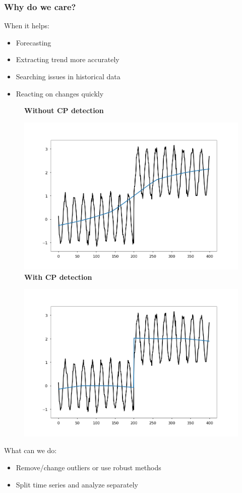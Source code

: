 \documentclass[intlimits, 9pt, unicode]{beamer}
\begin{document}
\begin{frame}
    \frametitle{Why do we care?}
When it helps:
    \begin{itemize}
    	\item Forecasting
	\item Extracting trend more accurately
    	\item Searching issues in historical data 
	\item Reacting on changes quickly
    \end{itemize}
   
	\begin{figure}
		\textbf{Without CP detection}\par\medskip
		\includegraphics[scale=0.05]{images/trend_fallacy}
		\textbf{With CP detection}\par\medskip
		\includegraphics[scale=0.05]{images/trend_succeed}
	\end{figure}
    
What can we do:
    \begin{itemize}
    	\item Remove/change outliers or use robust methods
	\item Split time series and analyze separately
    \end{itemize}

\end{frame}
\end{document}
